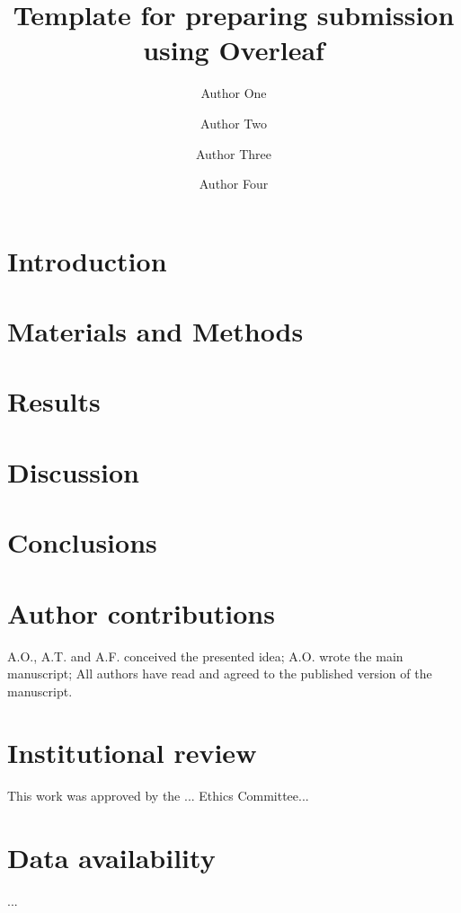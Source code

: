 \documentclass[fleqn,10pt,lineno]{manuscript}
\title{Template for preparing submission using Overleaf}
\author[1]{Author One}
\author[1]{Author Two}
\author[2,3]{Author Three}
\author[1]{Author Four}
\affil[1]{Author one affiliation}
\affil[2]{Author two affiliation}
\affil[3]{Author three affiliation}
\begin{document}
\flushbottom
\maketitle
\thispagestyle{empty}


\section*{Introduction}


\section*{Materials and Methods}


\section*{Results}



 
\section*{Discussion}



\section*{Conclusions}



\section*{Author contributions}
A.O., A.T. and A.F. conceived the presented idea; A.O. wrote the main manuscript; All authors have read and agreed to the published version of the manuscript.

\section*{Institutional review}
This work was approved by the ... Ethics Committee...

\section*{Data availability} 
...
\end{document}
